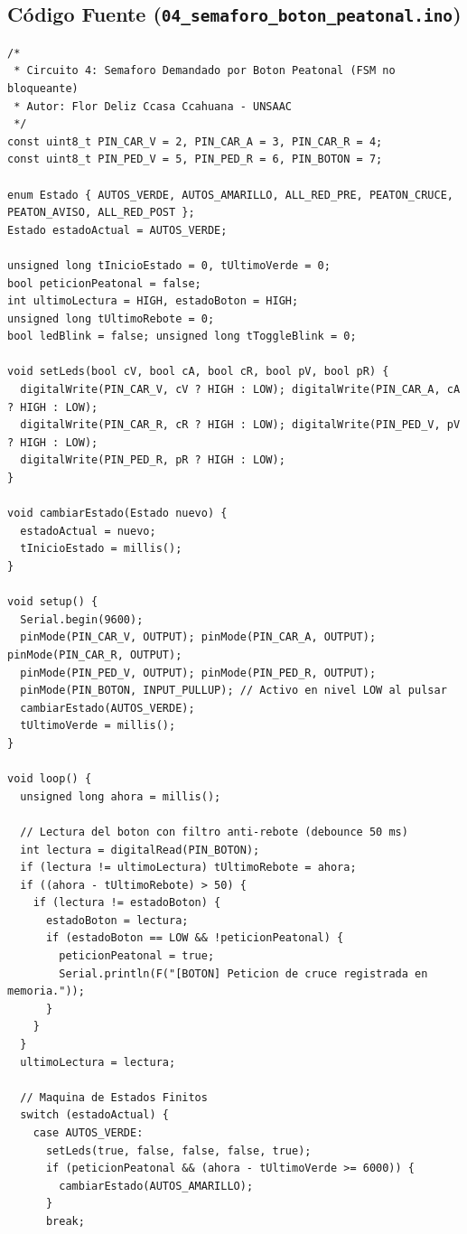 \documentclass[12pt,a4paper]{article}
\begin{document}
\subsection{Código Fuente (\texttt{04\_semaforo\_boton\_peatonal.ino})}
\begin{lstlisting}
/*
 * Circuito 4: Semaforo Demandado por Boton Peatonal (FSM no bloqueante)
 * Autor: Flor Deliz Ccasa Ccahuana - UNSAAC
 */
const uint8_t PIN_CAR_V = 2, PIN_CAR_A = 3, PIN_CAR_R = 4;
const uint8_t PIN_PED_V = 5, PIN_PED_R = 6, PIN_BOTON = 7;

enum Estado { AUTOS_VERDE, AUTOS_AMARILLO, ALL_RED_PRE, PEATON_CRUCE, PEATON_AVISO, ALL_RED_POST };
Estado estadoActual = AUTOS_VERDE;

unsigned long tInicioEstado = 0, tUltimoVerde = 0;
bool peticionPeatonal = false;
int ultimoLectura = HIGH, estadoBoton = HIGH;
unsigned long tUltimoRebote = 0;
bool ledBlink = false; unsigned long tToggleBlink = 0;

void setLeds(bool cV, bool cA, bool cR, bool pV, bool pR) {
  digitalWrite(PIN_CAR_V, cV ? HIGH : LOW); digitalWrite(PIN_CAR_A, cA ? HIGH : LOW);
  digitalWrite(PIN_CAR_R, cR ? HIGH : LOW); digitalWrite(PIN_PED_V, pV ? HIGH : LOW);
  digitalWrite(PIN_PED_R, pR ? HIGH : LOW);
}

void cambiarEstado(Estado nuevo) {
  estadoActual = nuevo;
  tInicioEstado = millis();
}

void setup() {
  Serial.begin(9600);
  pinMode(PIN_CAR_V, OUTPUT); pinMode(PIN_CAR_A, OUTPUT); pinMode(PIN_CAR_R, OUTPUT);
  pinMode(PIN_PED_V, OUTPUT); pinMode(PIN_PED_R, OUTPUT);
  pinMode(PIN_BOTON, INPUT_PULLUP); // Activo en nivel LOW al pulsar
  cambiarEstado(AUTOS_VERDE);
  tUltimoVerde = millis();
}

void loop() {
  unsigned long ahora = millis();

  // Lectura del boton con filtro anti-rebote (debounce 50 ms)
  int lectura = digitalRead(PIN_BOTON);
  if (lectura != ultimoLectura) tUltimoRebote = ahora;
  if ((ahora - tUltimoRebote) > 50) {
    if (lectura != estadoBoton) {
      estadoBoton = lectura;
      if (estadoBoton == LOW && !peticionPeatonal) {
        peticionPeatonal = true;
        Serial.println(F("[BOTON] Peticion de cruce registrada en memoria."));
      }
    }
  }
  ultimoLectura = lectura;

  // Maquina de Estados Finitos
  switch (estadoActual) {
    case AUTOS_VERDE:
      setLeds(true, false, false, false, true);
      if (peticionPeatonal && (ahora - tUltimoVerde >= 6000)) {
        cambiarEstado(AUTOS_AMARILLO);
      }
      break;


\end{lstlisting}
\end{document}
